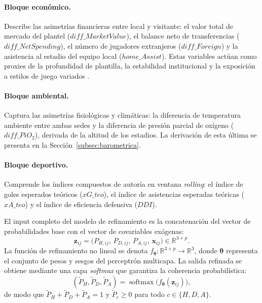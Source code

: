 \paragraph{Bloque econ\'omico.} Describe las asimetr\'ias financieras entre local y visitante: el valor total de mercado del plantel ($\mathit{diff\_MarketValue}$), el balance neto de transferencias ($\mathit{diff\_NetSpending}$), el n\'umero de jugadores extranjeros ($\mathit{diff\_Foreign}$) y la asistencia al estadio del equipo local ($\mathit{home\_Assist}$). Estas variables act\'uan como proxies de la profundidad de plantilla, la estabilidad institucional y la exposici\'on a estilos de juego variados \cite{SZYMAN1,SZYMAN2}.

\paragraph{Bloque ambiental.} Captura las asimetr\'ias fisiol\'ogicas y clim\'aticas: la diferencia de temperatura ambiente entre ambas sedes y la diferencia de presi\'on parcial de ox\'igeno ($\mathit{diff\_PiO_2}$), derivada de la altitud de los estadios. La derivaci\'on de esta \'ultima se presenta en la Secci\'on~\ref{subsec:barometrica}.

\paragraph{Bloque deportivo.} Comprende los \'indices compuestos de autor\'ia en ventana \textit{rolling}: el \'indice de goles esperados te\'oricos ($\mathit{xG\_teo}$), el \'indice de asistencias esperadas te\'oricas ($\mathit{xA\_teo}$) y el \'indice de eficiencia defensiva ($\mathit{DDI}$).

El input completo del modelo de refinamiento es la concatenaci\'on del vector de probabilidades base con el vector de covariables ex\'ogenas:
\begin{equation}\label{eq:input_mlp}
	\mathbf{z}_{ij} = \bigl(P_{H,ij},\, P_{D,ij},\, P_{A,ij},\, \mathbf{x}_{ij}\bigr) \in \mathbb{R}^{3+p}.
\end{equation}
La funci\'on de refinamiento no lineal se denota $f_{\boldsymbol{\theta}}: \mathbb{R}^{3+p} \to \mathbb{R}^3$, donde $\boldsymbol{\theta}$ representa el conjunto de pesos y sesgos del perceptr\'on multicapa. La salida refinada se obtiene mediante una capa \emph{softmax} que garantiza la coherencia probabil\'istica:
\begin{equation}\label{eq:mlp_refinamiento}
	(\tilde{P}_H, \tilde{P}_D, \tilde{P}_A) = \operatorname{softmax}\bigl(f_{\boldsymbol{\theta}}(\mathbf{z}_{ij})\bigr),
\end{equation}
de modo que $\tilde{P}_H + \tilde{P}_D + \tilde{P}_A = 1$ y $\tilde{P}_c \geq 0$ para todo $c \in \{H,D,A\}$.

